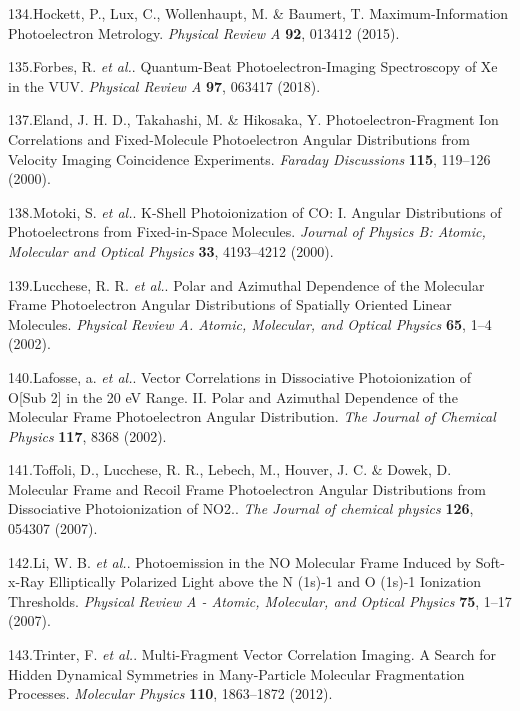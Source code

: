 \documentclass[10pt]{article}
\begin{document}
\label{csl:134}134.Hockett, P., Lux, C., Wollenhaupt, M. \& Baumert, T. {Maximum-Information Photoelectron Metrology}. \textit{Physical Review A} \textbf{92}, 013412 (2015).

\label{csl:135}135.Forbes, R. \textit{et al.}. {Quantum-Beat Photoelectron-Imaging Spectroscopy of {{Xe}} in the {{VUV}}}. \textit{Physical Review A} \textbf{97}, 063417 (2018).

\label{csl:137}137.Eland, J. H. D., Takahashi, M. \& Hikosaka, Y. {Photoelectron-Fragment Ion Correlations and Fixed-Molecule Photoelectron Angular Distributions from Velocity Imaging Coincidence Experiments}. \textit{Faraday Discussions} \textbf{115}, 119–126 (2000).

\label{csl:138}138.Motoki, S. \textit{et al.}. {K-Shell Photoionization of {{CO}}: {{I}}. {{Angular}} Distributions of Photoelectrons from Fixed-in-Space Molecules}. \textit{Journal of Physics B: Atomic, Molecular and Optical Physics} \textbf{33}, 4193–4212 (2000).

\label{csl:139}139.Lucchese, R. R. \textit{et al.}. {Polar and Azimuthal Dependence of the Molecular Frame Photoelectron Angular Distributions of Spatially Oriented Linear Molecules}. \textit{Physical Review A. Atomic, Molecular, and Optical Physics} \textbf{65}, 1–4 (2002).

\label{csl:140}140.Lafosse, a. \textit{et al.}. {Vector Correlations in Dissociative Photoionization of {{O}}[Sub 2] in the 20 {{eV}} Range. {{II}}. {{Polar}} and Azimuthal Dependence of the Molecular Frame Photoelectron Angular Distribution}. \textit{The Journal of Chemical Physics} \textbf{117}, 8368 (2002).

\label{csl:141}141.Toffoli, D., Lucchese, R. R., Lebech, M., Houver, J. C. \& Dowek, D. {Molecular Frame and Recoil Frame Photoelectron Angular Distributions from Dissociative Photoionization of {{NO2}}.}. \textit{The Journal of chemical physics} \textbf{126}, 054307 (2007).

\label{csl:142}142.Li, W. B. \textit{et al.}. {Photoemission in the {{NO}} Molecular Frame Induced by Soft-x-Ray Elliptically Polarized Light above the {{N}} (1s)-1 and {{O}} (1s)-1 Ionization Thresholds}. \textit{Physical Review A - Atomic, Molecular, and Optical Physics} \textbf{75}, 1–17 (2007).

\label{csl:143}143.Trinter, F. \textit{et al.}. {Multi-Fragment Vector Correlation Imaging. {{A}} Search for Hidden Dynamical Symmetries in Many-Particle Molecular Fragmentation Processes}. \textit{Molecular Physics} \textbf{110}, 1863–1872 (2012).
\end{document}
